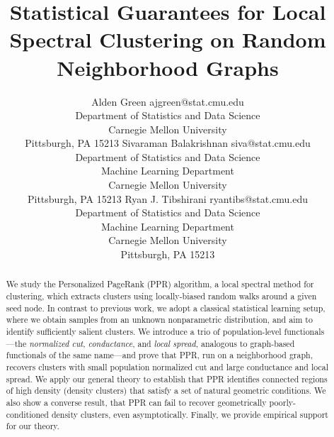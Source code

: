 \documentclass[twoside,11pt]{article}
\newcommand{\1}{\mathbf{1}}
\begin{document}
\title{Statistical Guarantees for Local Spectral Clustering on Random Neighborhood Graphs}

\author{\name Alden Green \email ajgreen@stat.cmu.edu \\
	\addr Department of Statistics and Data Science\\
	Carnegie Mellon University\\
	Pittsburgh, PA 15213
	\AND
	\name Sivaraman Balakrishnan \email siva@stat.cmu.edu \\
	\addr Department of Statistics and Data Science\\
	Machine Learning Department\\
	Carnegie Mellon University\\
	Pittsburgh, PA 15213
	\AND
	Ryan J. Tibshirani \email ryantibs@stat.cmu.edu \\
	\addr Department of Statistics and Data Science\\
	Machine Learning Department\\
	Carnegie Mellon University\\
	Pittsburgh, PA 15213}


\maketitle

\begin{abstract}%
	We study the Personalized PageRank (PPR) algorithm, a local spectral method for clustering, which extracts clusters using locally-biased random walks around a given seed node.  In contrast to previous work, we adopt a classical statistical learning setup, where we obtain samples from an unknown nonparametric distribution, and aim to identify sufficiently salient clusters.  We introduce a trio of population-level functionals---the \emph{normalized cut}, \emph{conductance}, and \emph{local spread}, analogous to graph-based functionals of the same name---and prove that PPR, run on a neighborhood graph, recovers clusters with small population normalized cut and large conductance and local spread. We apply our general theory to establish that PPR identifies connected regions of high density (density clusters) that satisfy a set of natural geometric conditions. We also show a converse result, that PPR can fail to recover geometrically poorly-conditioned density clusters, even asymptotically. Finally, we provide empirical support for our theory.
\end{abstract}
\end{document}

